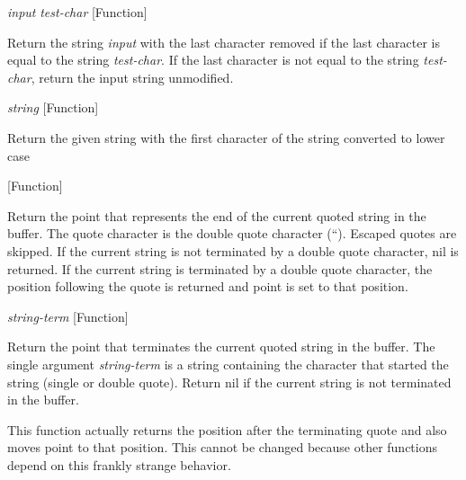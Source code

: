 \vspace{1em}
\noindent
{}
\usebox{\funcname}\emph{input} \emph{test-char}
 \hfill [Function]

\begin{doc-string}
Return the string \emph{input} with the last character removed if the last character
is equal to the string \emph{test-char}.  If the last character is not equal to the
string \emph{test-char}, return the input string unmodified.
\end{doc-string}

\vspace{1em}
\noindent
{}
\usebox{\funcname}\emph{string}
 \hfill [Function]

\begin{doc-string}
Return the given string with the first character of the string converted
to lower case
\end{doc-string}

\vspace{1em}
\noindent
{}
\usebox{\funcname}
 \hfill [Function]

\begin{doc-string}
Return the point that represents the end of the current quoted string in the
buffer.  The quote character is the double quote character (``).  Escaped quotes
are skipped.  If the current string is not terminated by a double quote
character, nil is returned.  If the current string is terminated by a double
quote character, the position following the quote is returned and point is set
to that position.
\end{doc-string}

\vspace{1em}
\noindent
{}
\usebox{\funcname}\emph{string-term}
 \hfill [Function]

\begin{doc-string}
Return the point that terminates the current quoted string in the buffer.
The single argument \emph{string-term} is a string containing the character that
started the string (single or double quote).  Return nil if the current
string is not terminated in the buffer.

This function actually returns the position after the terminating quote and
also moves point to that position.  This cannot be changed because other
functions depend on this frankly strange behavior.
\end{doc-string}

